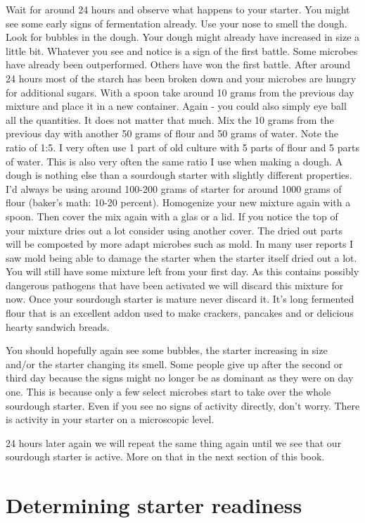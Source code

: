 Wait for around 24 hours and observe what happens to your starter.
You might see some early signs of fermentation already. Use your nose
to smell the dough. Look for bubbles in the dough. Your dough
might already have increased in size a little bit. Whatever
you see and notice is a sign of the first battle. Some microbes
have already been outperformed. Others have won the first battle.
After around 24 hours most of the starch has been broken down
and your microbes are hungry for additional sugars. With a spoon
take around 10 grams from the previous day mixture and place
it in a new container. Again - you could also simply eye ball 
all the quantities. It does not matter that much. Mix the 10
grams from the previous day with another 50 grams of flour
and 50 grams of water. Note the ratio of 1:5. I very often use
1 part of old culture with 5 parts of flour and 5 parts of water.
This is also very often the same ratio I use when making a dough.
A dough is nothing else than a sourdough starter with slightly different
properties. I'd always be using around 100-200 grams of starter
for around 1000 grams of flour (baker's math: 10-20 percent).
Homogenize your new mixture again with a spoon. Then cover
the mix again with a glas or a lid. If you notice the top of
your mixture dries out a lot consider using another cover. The
dried out parts will be composted by more adapt microbes such as
mold. In many user reports I saw mold being able to damage
the starter when the starter itself dried out a lot. You will
still have some mixture left from your first day. As this contains
possibly dangerous pathogens that have been activated we will discard
this mixture for now. Once your sourdough starter is mature never
discard it. It's long fermented flour that is an excellent addon
used to make crackers, pancakes and or delicious hearty sandwich
breads.

You should hopefully again see some bubbles, the starter increasing
in size and/or the starter changing its smell. Some people give
up after the second or third day because the signs might no longer
be as dominant as they were on day one. This is because only a few
select microbes start to take over the whole sourdough starter. Even
if you see no signs of activity directly, don't worry. There is activity in
your starter on a microscopic level.

24 hours later again we will repeat the same thing again until
we see that our sourdough starter is active. More on that in the
next section of this book.

\section{Determining starter readiness}

